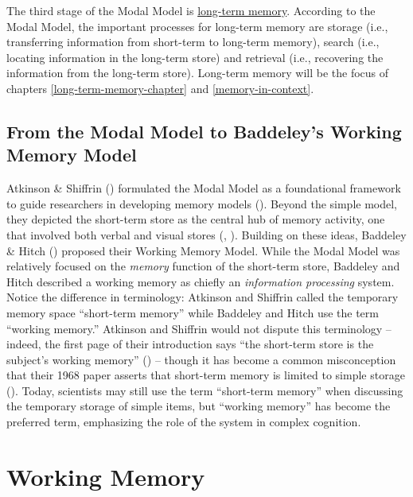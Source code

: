 \documentclass[
]{krantz}
\begin{document}
The third stage of the Modal Model is \hyperref[long-term-memory]{long-term memory}. According to the Modal Model, the important processes for long-term memory are storage (i.e., transferring information from short-term to long-term memory), search (i.e., locating information in the long-term store) and retrieval (i.e., recovering the information from the long-term store). Long-term memory will be the focus of chapters \ref{long-term-memory-chapter} and \ref{memory-in-context}.

\subsection*{From the Modal Model to Baddeley's Working Memory Model}\label{from-the-modal-model-to-baddeleys-working-memory-model}


Atkinson \& Shiffrin () formulated the Modal Model as a foundational framework to guide researchers in developing memory models (). Beyond the simple model, they depicted the short-term store as the central hub of memory activity, one that involved both verbal and visual stores (, ). Building on these ideas, Baddeley \& Hitch () proposed their Working Memory Model. While the Modal Model was relatively focused on the \emph{memory} function of the short-term store, Baddeley and Hitch described a working memory as chiefly an \emph{information processing} system. Notice the difference in terminology: Atkinson and Shiffrin called the temporary memory space ``short-term memory'' while Baddeley and Hitch use the term ``working memory.'' Atkinson and Shiffrin would not dispute this terminology -- indeed, the first page of their introduction says ``the short-term store is the subject's working memory'' () -- though it has become a common misconception that their 1968 paper asserts that short-term memory is limited to simple storage (). Today, scientists may still use the term ``short-term memory'' when discussing the temporary storage of simple items, but ``working memory'' has become the preferred term, emphasizing the role of the system in complex cognition.

\section{Working Memory}\label{working-memory}
\end{document}
